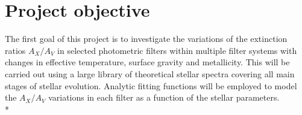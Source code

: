 \documentclass[12pt, a4paper]{report}
\begin{document}
\section{Project objective}
The first goal of this project is to investigate the variations of the extinction ratios $A_{X}/A_{V}$ in selected photometric filters within multiple filter systems with changes in effective temperature, surface gravity and metallicity. This will be carried out using a large library of theoretical stellar spectra covering all main stages of stellar evolution. Analytic fitting functions will be employed to model the $A_{X}/A_{V}$ variations in each filter as a function of the stellar parameters. \\*




\end{document}
